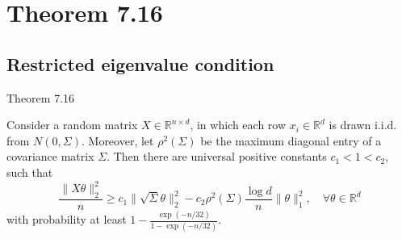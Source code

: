 \documentclass[10pt,handout,english]{beamer}
\newcommand{\R}{\mathbb{R}}
\begin{document}
\section{Theorem 7.16}
\subsection{Restricted eigenvalue condition}
\begin{frame}{Theorem 7.16}
\begin{theorem}[7.16]
Consider a random matrix $X\in\R^{n\times d}$, in which each row $x_i\in \R^d$ is drawn i.i.d. from $N(0,\Sigma)$. Moreover, let $\rho^2\left(\Sigma\right)$ be the maximum diagonal entry of a covariance matrix $\Sigma$. Then there are universal positive constants $c_1<1<c_2$, such that\justifying
\begin{equation}\label{eq: thequation}
\frac{\lVert X\theta\rVert_2^2}{n}\geq c_1\lVert\sqrt{\Sigma}\theta\rVert_2^2-c_2\rho^2\left(\Sigma\right)\frac{\log d}{n}\lVert\theta\rVert_1^2,\quad\forall \theta\in\R^d
\end{equation}
with probability at least $1-\frac{\exp{(-n/32)}}{1-\exp{(-n/32)}}$.
\end{theorem}
\end{frame}
\end{document}
